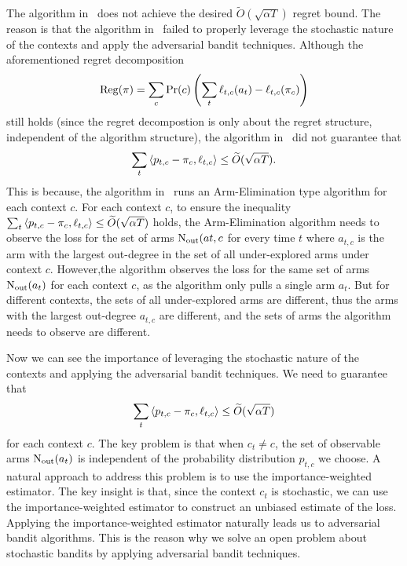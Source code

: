 The algorithm in~\citet{Han24} does not achieve the desired $\widetilde{O}(\sqrt{\alpha T})$ regret bound.
%
The reason is that the algorithm in~\citet{Han24} failed to properly leverage the stochastic nature of the contexts and apply the adversarial bandit techniques.
%
Although the aforementioned regret decomposition
\[\operatorname{\mathrm{Reg}}(\pi) = \sum_c \Pr(c) \left( \sum_{t} \ell_{t,c}(a_t) - \ell_{t,c}(\pi_c) \right)\]
still holds (since the regret decompostion is only about the regret structure, independent of the algorithm structure),
%
the algorithm in~\citet{Han24} did not guarantee that
\[\sum_{t} \left\langle p_{t,c} - \pi_c, \ell_{t,c} \right\rangle\le \widetilde{O}(\sqrt{\alpha T}).\]
%
This is because, the algorithm in~\citet{Han24} runs an Arm-Elimination type algorithm for each context $c$.
%
For each context $c$, to ensure the inequality $\sum_{t} \left\langle p_{t,c} - \pi_c, \ell_{t,c} \right\rangle\le \widetilde{O}(\sqrt{\alpha T})$ holds,
%
the Arm-Elimination algorithm needs to observe the loss for the set of arms $\operatorname{N_{\text{out}}}(a{t,c}$ for every time $t$
%
where $a_{t,c}$ is the arm with the largest out-degree in the set of all under-explored arms under context $c$.
%
However,the algorithm observes the loss for the same set of arms $\operatorname{N_{\text{out}}}(a_t)$ for each context $c$, as the algorithm only pulls a single arm $a_t$.
%
But for different contexts, the sets of all under-explored arms are different, thus the arms with the largest out-degree $a_{t,c}$ are different,%
and the sets of arms the algorithm needs to observe are different.
%

Now we can see the importance of leveraging the stochastic nature of the contexts and applying the adversarial bandit techniques.
%
We need to guarantee that
\[\sum_{t} \left\langle p_{t,c} - \pi_c, \ell_{t,c} \right\rangle\le \widetilde{O}(\sqrt{\alpha T})\]
%
for each context $c$.
%
The key problem is that when $c_t \neq c$, the set of observable arms $\operatorname{N_{\text{out}}}(a_t) $ is independent of the probability distribution $p_{t,c}$ we choose.
%
A natural approach to address this problem is to use the importance-weighted estimator.
%
The key insight  is that, since the context $c_t$ is stochastic, we can use the importance-weighted estimator to construct  an unbiased estimate of the loss.
%
Applying the importance-weighted estimator naturally leads us to adversarial bandit algorithms.
%
This is the reason why we solve an open problem about stochastic bandits by applying adversarial bandit techniques.


